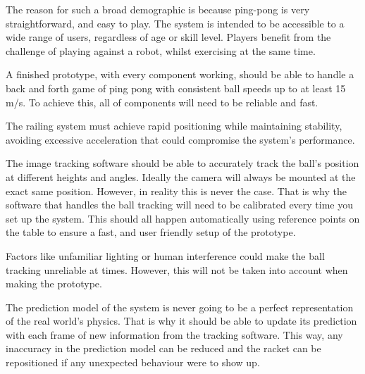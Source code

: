 The reason for such a broad demographic is because ping-pong is very straightforward, and easy to play. The system is intended to be accessible to a wide range of users, regardless of age or skill level. Players benefit from the challenge of playing against a robot, whilst exercising at the same time.

A finished prototype, with every component working, should be able to handle a back and forth game of ping pong with consistent ball speeds up to at least 15 m/s. To achieve this, all of components will need to be reliable and fast.

The railing system must achieve rapid positioning while maintaining stability, avoiding excessive acceleration that could compromise the system's performance.

The image tracking software should be able to accurately track the ball's position at different heights and angles. Ideally the camera will always be mounted at the exact same position. However, in reality this is never the case. That is why the software that handles the ball tracking will need to be calibrated every time you set up the system. This should all happen automatically using reference points on the table to ensure a fast, and user friendly setup of the prototype.

Factors like unfamiliar lighting or human interference could make the ball tracking unreliable at times. However, this will not be taken into account when making the prototype.

The prediction model of the system is never going to be a perfect representation of the real world's physics. That is why it should be able to update its prediction with each frame of new information from the tracking software. This way, any inaccuracy in the prediction model can be reduced and the racket can be repositioned if any unexpected behaviour were to show up.